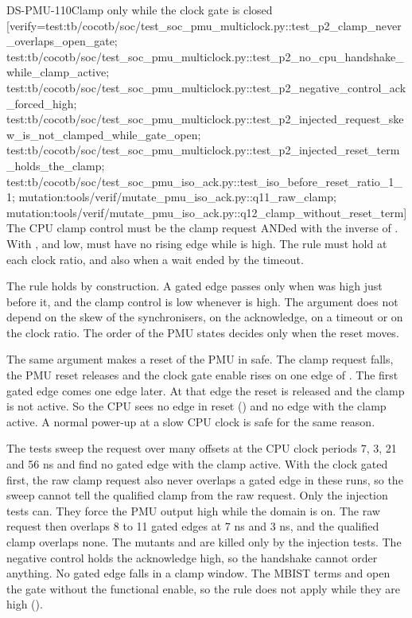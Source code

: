 \begin{requirement}{DS-PMU-110}{Clamp only while the clock gate is closed}
[verify={test:tb/cocotb/soc/test_soc_pmu_multiclock.py::test_p2_clamp_never_overlaps_open_gate; test:tb/cocotb/soc/test_soc_pmu_multiclock.py::test_p2_no_cpu_handshake_while_clamp_active; test:tb/cocotb/soc/test_soc_pmu_multiclock.py::test_p2_negative_control_ack_forced_high; test:tb/cocotb/soc/test_soc_pmu_multiclock.py::test_p2_injected_request_skew_is_not_clamped_while_gate_open; test:tb/cocotb/soc/test_soc_pmu_multiclock.py::test_p2_injected_reset_term_holds_the_clamp; test:tb/cocotb/soc/test_soc_pmu_iso_ack.py::test_iso_before_reset_ratio_1_1; mutation:tools/verif/mutate_pmu_iso_ack.py::q11_raw_clamp; mutation:tools/verif/mutate_pmu_iso_ack.py::q12_clamp_without_reset_term}]
The CPU clamp control  must be the clamp request  ANDed with the inverse of . With ,  and  low,  must have no rising edge while  is high. The rule must hold at each clock ratio, and also when a wait ended by the timeout.
\end{requirement}
\begin{information}
The rule holds by construction. A gated edge passes only when  was high just before it, and the clamp control is low whenever  is high. The argument does not depend on the skew of the synchronisers, on the acknowledge, on a timeout or on the clock ratio. The order of the PMU states decides only when the reset moves.

The same argument makes a reset of the PMU in  safe. The clamp request falls, the PMU reset releases and the clock gate enable rises on one edge of . The first gated edge comes one edge later. At that edge the reset is released and the clamp is not active. So the CPU sees no edge in reset () and no edge with the clamp active. A normal power-up at a slow CPU clock is safe for the same reason.

The tests sweep the request over many offsets at the CPU clock periods 7, 3, 21 and 56 ns and find no gated edge with the clamp active. With the clock gated first, the raw clamp request also never overlaps a gated edge in these runs, so the sweep cannot tell the qualified clamp from the raw request. Only the injection tests can. They force the PMU output  high while the domain is on. The raw request then overlaps 8 to 11 gated edges at 7 ns and 3 ns, and the qualified clamp overlaps none. The mutants  and  are killed only by the injection tests. The negative control holds the acknowledge high, so the handshake cannot order anything. No gated edge falls in a clamp window. The MBIST terms and  open the gate without the functional enable, so the rule does not apply while they are high ().
\end{information}

